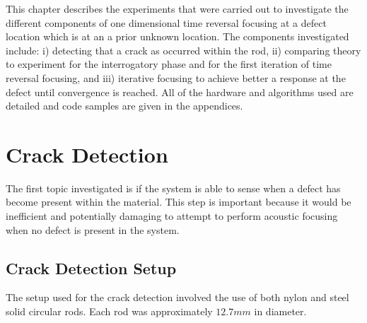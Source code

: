 
This chapter describes the experiments that were carried out to investigate the different components of one dimensional time reversal focusing at a defect location which is at an a prior unknown location. The components investigated include: i) detecting that a crack as occurred within the rod, ii) comparing theory to experiment for the interrogatory phase and for the first iteration of time reversal focusing, and iii) iterative focusing to achieve better a response at the defect until convergence is reached. All of the hardware and algorithms used are detailed and code samples are given in the appendices.

\section{Crack Detection}

The first topic investigated is if the system is able to sense when a defect has become present within the material. This step is important because it would be inefficient and potentially damaging to attempt to perform acoustic focusing when no defect is present in the system.

\subsection{Crack Detection Setup}
The setup used for the crack detection involved the use of both nylon and steel solid circular rods. Each rod was approximately $12.7 mm$ in diameter. 